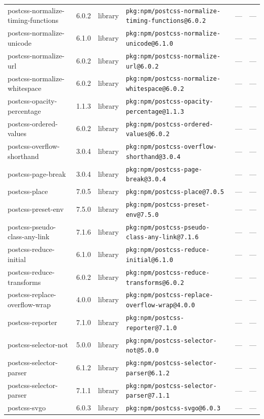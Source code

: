 \documentclass[11pt]{article}
\begin{document}
\begin{longtable}{|l|l|l|p{2.2cm}|l|p{4cm}|}
postcss-normalize-timing-functions & 6.0.2 & library & \texttt{pkg:npm/postcss-normalize-timing-functions@6.0.2} & — & — \\
postcss-normalize-unicode & 6.1.0 & library & \texttt{pkg:npm/postcss-normalize-unicode@6.1.0} & — & — \\
postcss-normalize-url & 6.0.2 & library & \texttt{pkg:npm/postcss-normalize-url@6.0.2} & — & — \\
postcss-normalize-whitespace & 6.0.2 & library & \texttt{pkg:npm/postcss-normalize-whitespace@6.0.2} & — & — \\
postcss-opacity-percentage & 1.1.3 & library & \texttt{pkg:npm/postcss-opacity-percentage@1.1.3} & — & — \\
postcss-ordered-values & 6.0.2 & library & \texttt{pkg:npm/postcss-ordered-values@6.0.2} & — & — \\
postcss-overflow-shorthand & 3.0.4 & library & \texttt{pkg:npm/postcss-overflow-shorthand@3.0.4} & — & — \\
postcss-page-break & 3.0.4 & library & \texttt{pkg:npm/postcss-page-break@3.0.4} & — & — \\
postcss-place & 7.0.5 & library & \texttt{pkg:npm/postcss-place@7.0.5} & — & — \\
postcss-preset-env & 7.5.0 & library & \texttt{pkg:npm/postcss-preset-env@7.5.0} & — & — \\
postcss-pseudo-class-any-link & 7.1.6 & library & \texttt{pkg:npm/postcss-pseudo-class-any-link@7.1.6} & — & — \\
postcss-reduce-initial & 6.1.0 & library & \texttt{pkg:npm/postcss-reduce-initial@6.1.0} & — & — \\
postcss-reduce-transforms & 6.0.2 & library & \texttt{pkg:npm/postcss-reduce-transforms@6.0.2} & — & — \\
postcss-replace-overflow-wrap & 4.0.0 & library & \texttt{pkg:npm/postcss-replace-overflow-wrap@4.0.0} & — & — \\
postcss-reporter & 7.1.0 & library & \texttt{pkg:npm/postcss-reporter@7.1.0} & — & — \\
postcss-selector-not & 5.0.0 & library & \texttt{pkg:npm/postcss-selector-not@5.0.0} & — & — \\
postcss-selector-parser & 6.1.2 & library & \texttt{pkg:npm/postcss-selector-parser@6.1.2} & — & — \\
postcss-selector-parser & 7.1.1 & library & \texttt{pkg:npm/postcss-selector-parser@7.1.1} & — & — \\
postcss-svgo & 6.0.3 & library & \texttt{pkg:npm/postcss-svgo@6.0.3} & — & — \\

\end{longtable}
\end{document}

